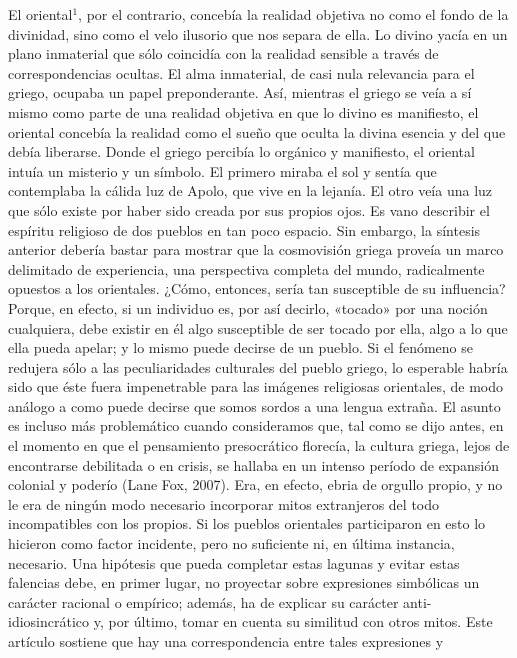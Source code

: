 \documentclass[a4paper]{article}
\begin{document}
El oriental$^{1}$, por el contrario, concebía la realidad objetiva no como el fondo
de la divinidad, sino como el velo ilusorio que nos separa de ella. Lo divino
yacía en un plano inmaterial que sólo coincidía con la realidad sensible a
través de correspondencias ocultas. El alma inmaterial, de casi nula relevancia
para el griego, ocupaba un papel preponderante. Así, mientras el griego se veía
a sí mismo como parte de una realidad objetiva en que lo divino es manifiesto,
el oriental concebía la realidad como el sueño que oculta la divina esencia y
del que debía liberarse. Donde el griego percibía lo orgánico y manifiesto, el
oriental intuía un misterio y un símbolo. El primero miraba el sol y sentía que
contemplaba la cálida luz de Apolo, que vive en la lejanía. El otro veía una luz
que sólo existe por haber sido creada por sus propios ojos. Es vano describir el
espíritu religioso de dos pueblos en tan poco espacio. Sin embargo, la síntesis
anterior debería bastar para mostrar que la cosmovisión griega proveía un marco
delimitado de experiencia, una perspectiva completa del mundo, radicalmente
opuestos a los orientales. ¿Cómo, entonces, sería tan susceptible de su
influencia? Porque, en efecto, si un individuo es, por así decirlo, «tocado» por
una noción cualquiera, debe existir en él algo susceptible de ser tocado por
ella, algo a lo que ella pueda apelar; y lo mismo puede decirse de un pueblo. Si
el fenómeno se redujera sólo a las peculiaridades culturales del pueblo griego,
lo esperable habría sido que éste fuera impenetrable para las imágenes
religiosas orientales, de modo análogo a como puede decirse que somos sordos a
una lengua extraña. El asunto es incluso más problemático cuando consideramos
que, tal como se dijo antes, en el momento en que el pensamiento presocrático
florecía, la cultura griega, lejos de encontrarse debilitada o en crisis, se
hallaba en un intenso período de expansión colonial y poderío (Lane Fox, 2007).
Era, en efecto, ebria de orgullo propio, y no le era de ningún modo necesario
incorporar mitos extranjeros del todo incompatibles con los propios. Si los
pueblos orientales participaron en esto lo hicieron como factor incidente, pero
no suficiente ni, en última instancia, necesario. Una hipótesis que pueda
completar estas lagunas y evitar estas falencias debe, en primer lugar, no
proyectar sobre expresiones simbólicas un carácter racional o empírico; además,
ha de explicar su carácter anti-idiosincrático y, por último, tomar en cuenta su similitud con otros mitos. Este
artículo sostiene que hay una correspondencia entre tales expresiones y
\end{document}
